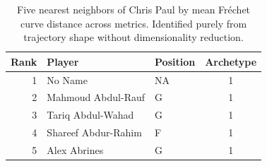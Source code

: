 \begin{table}[htbp]
  \centering\small
  \begin{tabular}{rllc}
    \toprule
    Rank & Player & Position & Archetype \\
    \midrule
    1 & No Name & NA & 1 \\
    2 & Mahmoud Abdul-Rauf & G & 1 \\
    3 & Tariq Abdul-Wahad & G & 1 \\
    4 & Shareef Abdur-Rahim & F & 1 \\
    5 & Alex Abrines & G & 1 \\
    \bottomrule
  \end{tabular}
  \caption{Five nearest neighbors of Chris Paul by mean Fr\'{e}chet curve distance across metrics. Identified purely from trajectory shape without dimensionality reduction.}
\end{table}


